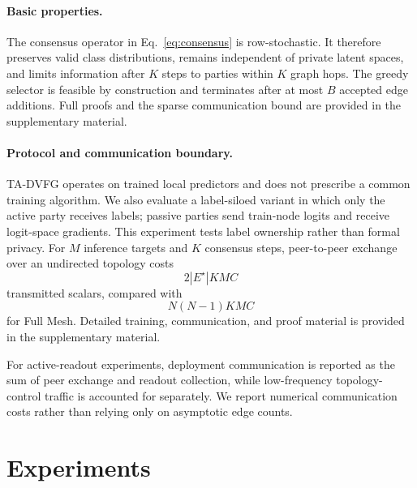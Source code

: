 \documentclass[letterpaper]{article} %
\newcommand{\method}{\textsc{TA-DVFG}}
\begin{document}
\paragraph{Basic properties.}
The consensus operator in Eq.~\eqref{eq:consensus} is row-stochastic. It
therefore preserves valid class distributions, remains independent of private
latent spaces, and limits information after $K$ steps to parties within $K$
graph hops. The greedy selector is feasible by construction and terminates
after at most $B$ accepted edge additions. Full proofs and the sparse
communication bound are provided in the supplementary material.

\paragraph{Protocol and communication boundary.}
\method{} operates on trained local predictors and does not prescribe a common
training algorithm. We also evaluate a label-siloed variant in which only the
active party receives labels; passive parties send train-node logits and
receive logit-space gradients. This experiment tests label ownership rather
than formal privacy. For $M$ inference targets and $K$ consensus steps,
peer-to-peer exchange over an undirected topology costs
\[
2|E^\star|KMC
\]
transmitted scalars, compared with
\[
N(N-1)KMC
\]
for Full Mesh. Detailed training, communication, and proof material is provided
in the supplementary material.

For active-readout experiments, deployment communication is reported as the sum
of peer exchange and readout collection, while low-frequency topology-control
traffic is accounted for separately. We report numerical communication costs
rather than relying only on asymptotic edge counts.

\section{Experiments}
\label{sec:experiments}
\end{document}
